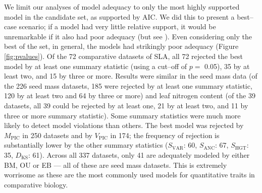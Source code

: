 \documentclass[a4paper,12pt]{article}
\begin{document}
We limit our analyses of model adequacy to only the most highly supported model in the candidate set, as supported by AIC. We did this to present a best--case scenario; if a model had very little relative support, it would be unremarkable if it also had poor adequacy (but see \citep{Ripplinger2010}). Even considering only the best of the set, in general, the models had strikingly poor adequacy (Figure \ref{fig:pvalues}). 
Of the 72 comparative datasets of SLA, all 72 rejected the best model by at least one summary statistic (using a cut--off of $p=$ 0.05), 35 by at least two, and 15 by three or more. 
Results were similar in the seed mass data (of the 226 seed mass datasets, 185 were rejected by at least one summary statistic, 120 by at least two and 64 by three or more) and leaf nitrogen content 
(of the 39 datasets, all 39 could be rejected by at least one, 21 by at least two, and 11 by three or more summary statistic). 
Some summary statistics were much more likely to detect model violations than others. The best model was rejected by $M_{\text{PIC}}$ in 250 datasets and by $V_{\text{PIC}}$ in 174; the frequency of rejection is substantially lower by the other summary statistics ($S_{\text{VAR}}$: 60, $S_{\text{ANC}}$: 67, $S_{\text{HGT}}$: 35, $D_{\text{KS}}$: 61).
Across all 337 datasets, only 41 are adequately modeled by either BM, OU or EB --- all of these are seed mass datasets. This is extremely worrisome as these are the most commonly used models for quantitative traits in comparative biology. 
\end{document}
